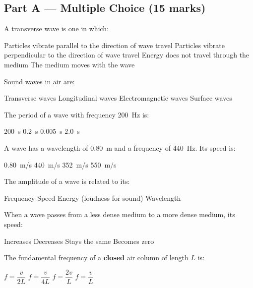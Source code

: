 \documentclass[addpoints]{exam}
\begin{document}
\newpage
\begin{questions}

\section*{Part A --- Multiple Choice (15 marks)}
\vspace{5mm}

\question[1] A transverse wave is one in which:
\begin{choices}
    \choice Particles vibrate parallel to the direction of wave travel
    \correctchoice Particles vibrate perpendicular to the direction of wave travel
    \choice Energy does not travel through the medium
    \choice The medium moves with the wave
\end{choices}

\question[1] Sound waves in air are:
\begin{choices}
    \choice Transverse waves
    \correctchoice Longitudinal waves
    \choice Electromagnetic waves
    \choice Surface waves
\end{choices}

\question[1] The period of a wave with frequency \SI{200}{Hz} is:
\begin{choices}
    \choice \SI{200}{s}
    \choice \SI{0.2}{s}
    \correctchoice \SI{0.005}{s}
    \choice \SI{2.0}{s}
\end{choices}

\question[1] A wave has a wavelength of \SI{0.80}{m} and a frequency of \SI{440}{Hz}.
Its speed is:
\begin{choices}
    \choice \SI{0.80}{m/s}
    \choice \SI{440}{m/s}
    \correctchoice \SI{352}{m/s}
    \choice \SI{550}{m/s}
\end{choices}

\question[1] The amplitude of a wave is related to its:
\begin{choices}
    \choice Frequency
    \choice Speed
    \correctchoice Energy (loudness for sound)
    \choice Wavelength
\end{choices}

\question[1] When a wave passes from a less dense medium to a more dense medium,
its speed:
\begin{choices}
    \choice Increases
    \correctchoice Decreases
    \choice Stays the same
    \choice Becomes zero
\end{choices}

\question[1] The fundamental frequency of a \textbf{closed} air column of length $L$ is:
\begin{choices}
    \choice $f = \dfrac{v}{2L}$
    \correctchoice $f = \dfrac{v}{4L}$
    \choice $f = \dfrac{2v}{L}$
    \choice $f = \dfrac{v}{L}$
\end{choices}


\end{questions}
\end{document}

